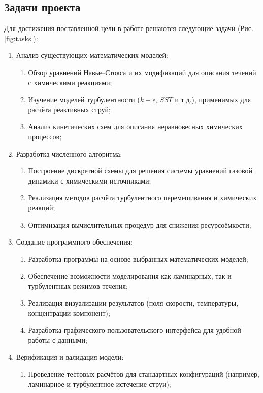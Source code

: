 \subsection{Задачи проекта}

Для достижения поставленной цели в работе решаются следующие задачи (Рис. \ref{fig:tasks}):

\begin{enumerate}
    \item Анализ существующих математических моделей:
    \begin{enumerate}
        \item Обзор уравнений Навье–Стокса и их модификаций для описания течений с химическими реакциями;
        \item Изучение моделей турбулентности ($k-\epsilon$, $SST$ и т.д.), применимых для расчёта реактивных струй;
        \item Анализ кинетических схем для описания неравновесных химических процессов;
    \end{enumerate}
    \item Разработка численного алгоритма:
    \begin{enumerate}
        \item Построение дискретной схемы для решения системы уравнений газовой динамики с химическими источниками;
        \item Реализация методов расчёта турбулентного перемешивания и химических реакций;
        \item Оптимизация вычислительных процедур для снижения ресурсоёмкости;
    \end{enumerate}
    \item Создание программного обеспечения:
    \begin{enumerate}
        \item Разработка программы на основе выбранных математических моделей;
        \item Обеспечение возможности моделирования как ламинарных, так и турбулентных режимов течения;
        \item Реализация визуализации результатов (поля скорости, температуры, концентрации компонент);
        \item Разработка графического пользовательского интерфейса для удобной работы с данными;
    \end{enumerate}
    \item Верификация и валидация модели:
    \begin{enumerate}
        \item Проведение тестовых расчётов для стандартных конфигураций (например, ламинарное и турбулентное истечение струи);

\end{enumerate}
\end{enumerate}
